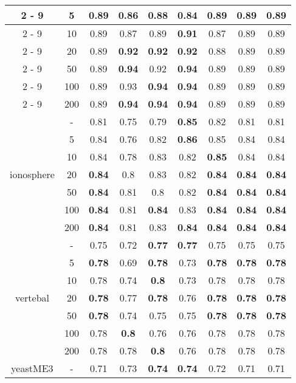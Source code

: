 \documentclass{article}%
\begin{document}
\begin{longtable}{c|c|ccccccc}
\cline{2%
-%
9}%
&5&\textbf{0.89}&0.86&0.88&0.84&\textbf{0.89}&\textbf{0.89}&\textbf{0.89}\\%
\cline{2%
-%
9}%
&10&0.89&0.87&0.89&\textbf{0.91}&0.87&0.89&0.89\\%
\cline{2%
-%
9}%
&20&0.89&\textbf{0.92}&\textbf{0.92}&\textbf{0.92}&0.88&0.89&0.89\\%
\cline{2%
-%
9}%
&50&0.89&\textbf{0.94}&0.92&\textbf{0.94}&0.89&0.89&0.89\\%
\cline{2%
-%
9}%
&100&0.89&0.93&\textbf{0.94}&\textbf{0.94}&0.89&0.89&0.89\\%
\cline{2%
-%
9}%
&200&0.89&\textbf{0.94}&\textbf{0.94}&\textbf{0.94}&0.89&0.89&0.89\\%
\hline%
\multirow{7}{*}{ionosphere}&{-}&0.81&0.75&0.79&\textbf{0.85}&0.82&0.81&0.81\\%
\cline{2%
-%
9}%
&5&0.84&0.76&0.82&\textbf{0.86}&0.85&0.84&0.84\\%
\cline{2%
-%
9}%
&10&0.84&0.78&0.83&0.82&\textbf{0.85}&0.84&0.84\\%
\cline{2%
-%
9}%
&20&\textbf{0.84}&0.8&0.83&0.82&\textbf{0.84}&\textbf{0.84}&\textbf{0.84}\\%
\cline{2%
-%
9}%
&50&\textbf{0.84}&0.81&0.8&0.82&\textbf{0.84}&\textbf{0.84}&\textbf{0.84}\\%
\cline{2%
-%
9}%
&100&\textbf{0.84}&0.81&\textbf{0.84}&0.83&\textbf{0.84}&\textbf{0.84}&\textbf{0.84}\\%
\cline{2%
-%
9}%
&200&\textbf{0.84}&0.81&0.83&\textbf{0.84}&\textbf{0.84}&\textbf{0.84}&\textbf{0.84}\\%
\hline%
\multirow{7}{*}{vertebal}&{-}&0.75&0.72&\textbf{0.77}&\textbf{0.77}&0.75&0.75&0.75\\%
\cline{2%
-%
9}%
&5&\textbf{0.78}&0.69&\textbf{0.78}&0.73&\textbf{0.78}&\textbf{0.78}&\textbf{0.78}\\%
\cline{2%
-%
9}%
&10&0.78&0.74&\textbf{0.8}&0.73&0.78&0.78&0.78\\%
\cline{2%
-%
9}%
&20&\textbf{0.78}&0.77&\textbf{0.78}&0.76&\textbf{0.78}&\textbf{0.78}&\textbf{0.78}\\%
\cline{2%
-%
9}%
&50&\textbf{0.78}&0.74&0.75&0.75&\textbf{0.78}&\textbf{0.78}&\textbf{0.78}\\%
\cline{2%
-%
9}%
&100&0.78&\textbf{0.8}&0.76&0.76&0.78&0.78&0.78\\%
\cline{2%
-%
9}%
&200&0.78&0.78&\textbf{0.8}&0.76&0.78&0.78&0.78\\%
\hline%
\multirow{7}{*}{yeastME3}&{-}&0.71&0.73&\textbf{0.74}&\textbf{0.74}&0.72&0.71&0.71\\%

\end{longtable}
\end{document}
